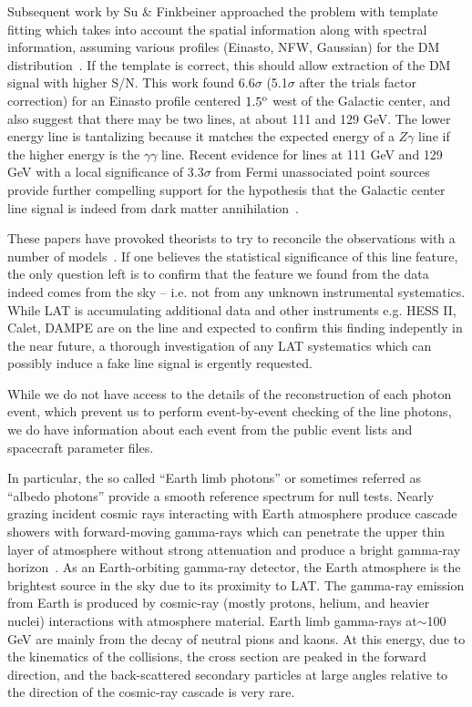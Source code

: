 \documentclass[aps,twocolumn,prd,superscriptaddress,showpacs,nofootinbib,fixfloat]{revtex4}
\newcommand{\degree}{^{\rm o}}
\begin{document}
Subsequent work by Su \& Finkbeiner approached the problem
with template fitting which takes into account the spatial
information along with spectral information, assuming
various profiles (Einasto, NFW, Gaussian) for the DM
distribution~\citep{linepaper}.  If the template is correct,
this should allow extraction of the DM signal with higher
S/N.  This work found 6.6$\sigma$ (5.1$\sigma$ after the
trials factor correction) for an Einasto profile centered
$1.5\degree$ west of the Galactic center, and also suggest
that there may be two lines, at about 111 and 129 GeV.  The
lower energy line is tantalizing because it matches the
expected energy of a $Z\gamma$ line if the higher energy is
the $\gamma\gamma$ line.  Recent evidence for lines at 111
GeV and 129 GeV with a local significance of $3.3\sigma$
from Fermi unassociated point sources provide further
compelling support for the hypothesis that the Galactic
center line signal is indeed from dark matter
annihilation~\cite{doubleline}.

These papers have provoked theorists to try to reconcile the
observations with a number of models~\citep{Dudas:2012,
  Choi:2012, Kyae:2012, Lee:2012, Rajaraman:2012,
  Acharya:2012, Garny:2012, Buckley:2012, Chu:2012,
  Kang:2012, Buchmuller:2012, Heo:2012, Park:2012,
  Tulin:2012, Cline:2012, Weiner:2012}. If one believes the
statistical significance of this line feature, the only
question left is to confirm that the feature we found from
the data indeed comes from the sky -- i.e. not from any
unknown instrumental systematics.  While LAT is accumulating
additional data and other instruments e.g. HESS II, Calet,
DAMPE are on the line and expected to confirm this finding
indepently in the near future, a thorough investigation of
any LAT systematics which can possibly induce a fake line
signal is ergently requested.

While we do not have access to the details of the
reconstruction of each photon event, which prevent us to
perform event-by-event checking of the line photons, we do
have information about each event from the public event
lists and spacecraft parameter files. 

In particular, the so called ``Earth limb photons'' or
sometimes referred as ``albedo photons'' provide a smooth
reference spectrum for null tests. Nearly grazing incident
cosmic rays interacting with Earth atmosphere produce
cascade showers with forward-moving gamma-rays which can
penetrate the upper thin layer of atmosphere without strong
attenuation and produce a bright gamma-ray
horizon~\citep[e.g.][and reference therein]{FermiLimb}. As
an Earth-orbiting gamma-ray detector, the Earth atmosphere
is the brightest source in the sky due to its proximity to
LAT. The gamma-ray emission from Earth is produced by
cosmic-ray (mostly protons, helium, and heavier nuclei)
interactions with atmosphere material. Earth limb gamma-rays
at$\sim$100 GeV are mainly from the decay of neutral pions
and kaons. At this energy, due to the kinematics of the
collisions, the cross section are peaked in the forward
direction, and the back-scattered secondary particles at
large angles relative to the direction of the cosmic-ray
cascade is very rare.
\end{document}

